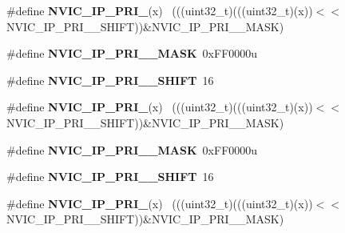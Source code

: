 \begin{DoxyCompactItemize}
\item 
\hypertarget{group___n_v_i_c___register___masks_ga2ee87e9760b319a619478b44d48a0781}{}\#define {\bfseries N\+V\+I\+C\+\_\+\+I\+P\+\_\+\+P\+R\+I\+\_}(x)                                              ~(((uint32\+\_\+t)(((uint32\+\_\+t)(x))$<$$<$N\+V\+I\+C\+\_\+\+I\+P\+\_\+\+P\+R\+I\+\_\+\_\+\+S\+H\+I\+F\+T))\&N\+V\+I\+C\+\_\+\+I\+P\+\_\+\+P\+R\+I\+\_\+\_\+\+M\+A\+S\+K)\label{group___n_v_i_c___register___masks_ga2ee87e9760b319a619478b44d48a0781}

\item 
\hypertarget{group___n_v_i_c___register___masks_gab53749f36c450457fd446a1711f69c13}{}\#define {\bfseries N\+V\+I\+C\+\_\+\+I\+P\+\_\+\+P\+R\+I\+\_\+\_\+\+M\+A\+S\+K}~0x\+F\+F0000u\label{group___n_v_i_c___register___masks_gab53749f36c450457fd446a1711f69c13}

\item 
\hypertarget{group___n_v_i_c___register___masks_ga40e00b75ebe69a73a1ee9a41ef0c3d9b}{}\#define {\bfseries N\+V\+I\+C\+\_\+\+I\+P\+\_\+\+P\+R\+I\+\_\+\_\+\+S\+H\+I\+F\+T}~16\label{group___n_v_i_c___register___masks_ga40e00b75ebe69a73a1ee9a41ef0c3d9b}

\item 
\hypertarget{group___n_v_i_c___register___masks_ga550661c149fe417e7d4e2e488552bd59}{}\#define {\bfseries N\+V\+I\+C\+\_\+\+I\+P\+\_\+\+P\+R\+I\+\_}(x)                                            ~(((uint32\+\_\+t)(((uint32\+\_\+t)(x))$<$$<$N\+V\+I\+C\+\_\+\+I\+P\+\_\+\+P\+R\+I\+\_\+\_\+\+S\+H\+I\+F\+T))\&N\+V\+I\+C\+\_\+\+I\+P\+\_\+\+P\+R\+I\+\_\+\_\+\+M\+A\+S\+K)\label{group___n_v_i_c___register___masks_ga550661c149fe417e7d4e2e488552bd59}

\item 
\hypertarget{group___n_v_i_c___register___masks_ga99c3d327033fb0d1f9bdbef784ebe3ed}{}\#define {\bfseries N\+V\+I\+C\+\_\+\+I\+P\+\_\+\+P\+R\+I\+\_\+\_\+\+M\+A\+S\+K}~0x\+F\+F0000u\label{group___n_v_i_c___register___masks_ga99c3d327033fb0d1f9bdbef784ebe3ed}

\item 
\hypertarget{group___n_v_i_c___register___masks_gaa24809c00c9d32beee7171f4a75221e8}{}\#define {\bfseries N\+V\+I\+C\+\_\+\+I\+P\+\_\+\+P\+R\+I\+\_\+\_\+\+S\+H\+I\+F\+T}~16\label{group___n_v_i_c___register___masks_gaa24809c00c9d32beee7171f4a75221e8}

\item 
\hypertarget{group___n_v_i_c___register___masks_gaf8701f5319b3a4dafebcc9b6a733e558}{}\#define {\bfseries N\+V\+I\+C\+\_\+\+I\+P\+\_\+\+P\+R\+I\+\_}(x)                                            ~(((uint32\+\_\+t)(((uint32\+\_\+t)(x))$<$$<$N\+V\+I\+C\+\_\+\+I\+P\+\_\+\+P\+R\+I\+\_\+\_\+\+S\+H\+I\+F\+T))\&N\+V\+I\+C\+\_\+\+I\+P\+\_\+\+P\+R\+I\+\_\+\_\+\+M\+A\+S\+K)\label{group___n_v_i_c___register___masks_gaf8701f5319b3a4dafebcc9b6a733e558}


\end{DoxyCompactItemize}
